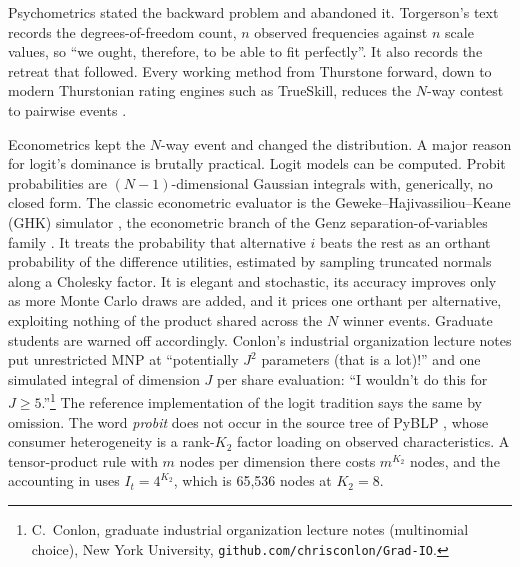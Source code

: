\documentclass[12pt]{article}
\theoremstyle{remark}
\begin{document}
Psychometrics stated the backward problem and abandoned it. Torgerson's
text records the degrees-of-freedom count, $n$ observed frequencies
against $n$ scale values, so ``we ought, therefore, to be able to fit
perfectly''. It also records the retreat that followed. Every working
method from Thurstone forward, down to modern Thurstonian rating
engines such as TrueSkill, reduces the $N$-way contest to pairwise
events \citep{torgerson1958,herbrich2006}.

Econometrics kept the $N$-way event and changed the distribution. A
major reason for logit's dominance is brutally practical. Logit models
can be computed. Probit probabilities are $(N-1)$-dimensional Gaussian
integrals with, generically, no closed form. The classic econometric
evaluator is the Geweke--Hajivassiliou--Keane (GHK) simulator
\citep{geweke1994,hajivassiliou1998,train2009}, the econometric branch
of the Genz separation-of-variables family \citep{genz1992}. It treats
the probability that alternative $i$ beats the rest as an orthant
probability of the difference utilities, estimated by sampling
truncated normals along a Cholesky factor. It is elegant and
stochastic, its accuracy improves only as more Monte Carlo draws are
added, and it prices one orthant per alternative, exploiting nothing of
the product shared across the $N$ winner events.
Graduate students are warned off accordingly. Conlon's industrial
organization lecture notes put unrestricted MNP at ``potentially $J^2$
parameters (that is a lot)!'' and one simulated integral of dimension
$J$ per share evaluation: ``I wouldn't do this for $J \geq
5$.''\footnote{C.~Conlon, graduate industrial organization lecture
notes (multinomial choice), New York University,
\texttt{github.com/chrisconlon/Grad-IO}.}
The reference implementation of the logit tradition says the same by
omission. The word \emph{probit} does not occur in the source tree of
PyBLP \citep{conlon2020}, whose consumer heterogeneity is a rank-$K_2$
factor loading on observed characteristics. A tensor-product rule with
$m$ nodes per dimension there costs $m^{K_2}$ nodes, and the accounting
in \citet{conlon2020} uses $I_t = 4^{K_2}$, which is 65{,}536 nodes at
$K_2 = 8$.
\end{document}
